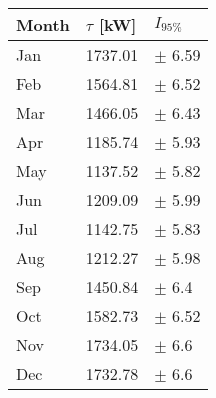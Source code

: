 \begin{tabular}{lll}
\toprule
Month & $\tau$ [kW] &   $I_{95\%}$ \\
\midrule
  Jan &     1737.01 &   $\pm$ 6.59 \\
  Feb &     1564.81 &   $\pm$ 6.52 \\
  Mar &     1466.05 &   $\pm$ 6.43 \\
  Apr &     1185.74 &   $\pm$ 5.93 \\
  May &     1137.52 &   $\pm$ 5.82 \\
  Jun &     1209.09 &   $\pm$ 5.99 \\
  Jul &     1142.75 &   $\pm$ 5.83 \\
  Aug &     1212.27 &   $\pm$ 5.98 \\
  Sep &     1450.84 &    $\pm$ 6.4 \\
  Oct &     1582.73 &   $\pm$ 6.52 \\
  Nov &     1734.05 &    $\pm$ 6.6 \\
  Dec &     1732.78 &    $\pm$ 6.6 \\
\bottomrule
\end{tabular}
